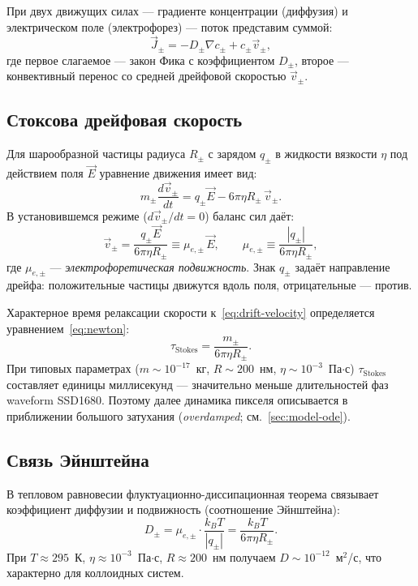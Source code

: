 При двух движущих силах — градиенте концентрации (диффузия) и
электрическом поле (электрофорез) — поток представим суммой:
\begin{equation}\label{eq:flux}
    \vec{J}_\pm = -D_\pm \nabla c_\pm + c_\pm \vec{v}_\pm,
\end{equation}
где первое слагаемое — закон Фика с коэффициентом $D_\pm$, второе —
конвективный перенос со средней дрейфовой скоростью $\vec{v}_\pm$.

\subsection*{Стоксова дрейфовая скорость}

Для шарообразной частицы радиуса $R_\pm$ с зарядом $q_\pm$ в жидкости вязкости
$\eta$ под действием поля $\vec{E}$ уравнение движения имеет вид:
\begin{equation}\label{eq:newton}
    m_\pm \frac{d\vec{v}_\pm}{dt}
    = q_\pm \vec{E} - 6\pi \eta R_\pm \, \vec{v}_\pm.
\end{equation}
В установившемся режиме ($d\vec{v}_\pm / dt = 0$) баланс сил даёт:
\begin{equation}\label{eq:drift-velocity}
    \vec{v}_\pm = \frac{q_\pm \vec{E}}{6\pi \eta R_\pm}
    \equiv \mu_{e,\pm}\, \vec{E},
    \qquad
    \mu_{e,\pm} \equiv \frac{|q_\pm|}{6\pi \eta R_\pm},
\end{equation}
где $\mu_{e,\pm}$ — \emph{электрофоретическая подвижность}. Знак $q_\pm$ задаёт
направление дрейфа: положительные частицы движутся вдоль поля, отрицательные —
против.

Характерное время релаксации скорости к~\eqref{eq:drift-velocity}
определяется уравнением~\eqref{eq:newton}:
\begin{equation}\label{eq:tau-stokes}
    \tau_{\mathrm{Stokes}} = \frac{m_\pm}{6\pi \eta R_\pm}.
\end{equation}
При типовых параметрах ($m \sim 10^{-17}$~кг, $R \sim 200$~нм,
$\eta \sim 10^{-3}$~Па$\cdot$с) $\tau_{\mathrm{Stokes}}$ составляет единицы
миллисекунд — значительно меньше длительностей фаз waveform
SSD1680. Поэтому далее динамика пикселя описывается в приближении
большого затухания (\emph{overdamped}; см.~\ref{sec:model-ode}).

\subsection*{Связь Эйнштейна}

В тепловом равновесии флуктуационно-диссипационная теорема связывает
коэффициент диффузии и подвижность (соотношение Эйнштейна):
\begin{equation}\label{eq:einstein}
    D_\pm = \mu_{e,\pm} \cdot \frac{k_B T}{|q_\pm|}
          = \frac{k_B T}{6\pi \eta R_\pm}.
\end{equation}
При $T \approx 295$~К, $\eta \approx 10^{-3}$~Па$\cdot$с, $R \approx 200$~нм
получаем $D \sim 10^{-12}$~м$^2$/с, что характерно для коллоидных систем.


